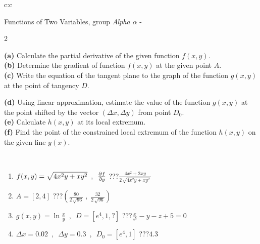 \documentclass[10pt]{report}
\begin{document}
\thispagestyle{empty}
\begin{tabular}{c:c}
\begin{minipage}[c][104.5mm][t]{0.5\linewidth}
\begin{center}
\vspace{7mm}
{\huge \LARGE Functions of Two Variables, group \textit{Alpha $\alpha$} -}\\[5mm]
\begin{minipage}{0.95\linewidth}
\begin{center}
{\small \begin{multicols}{2} \raggedright
\textbf{(a)} Calculate the partial derivative of the given function \(f(x,y)\). \\[1mm]
\textbf{(b)} Determine the gradient of function \(f(x,y)\) at the given point \(A\). \\[1mm]
\textbf{(c)} Write the equation of the tangent plane to the graph of the function \(g(x,y)\) at the point of tangency \(D\). \par \columnbreak
\textbf{(d)} Using linear approximation, estimate the value of the function \(g(x,y)\) at the point shifted by the vector \((\Delta x, \Delta y)\) from point \(D_0\). \\[1mm]
\textbf{(e)} Calculate \(h(x,y)\) at its local extremum. \\[1mm]
\textbf{(f)} Find the point of the constrained local extremum of the function \(h(x,y)\) on the given line \(y(x)\). \\[1mm]
\end{multicols}
}
\end{center}
\end{minipage}
\\[4mm]
\begin{minipage}{0.79\linewidth}
\begin{center}
\begin{varwidth}{\linewidth}
\begin{enumerate}
\normalsizerr
\item $f(x,y) = \sqrt{4x^2y + xy^2}\enspace , \enspace \pdv{f}{y}$\quad \dotfill\; ???\;\dotfill \quad $\frac{4x^2+2xy}{2\,\sqrt{4x^2y+xy^2}}$
\item $A = [2, 4]$\quad \dotfill\; ???\;\dotfill \quad $\left( \frac{80}{2\,\sqrt{96}} \;,\; \frac{32}{2\,\sqrt{96}} \right)$
\item $g(x,y) = \ln\frac{x}{y} \enspace , \enspace D=[e^{4},1,?]$\quad \dotfill\; ???\;\dotfill \quad $\frac{x}{e^5} - y - z + 5 = 0$
\item $\Delta x = {0.02} \enspace,\enspace \Delta y = {0.3} \enspace,\enspace D_0 = [e^{4},1]$\quad \dotfill\; ???\;\dotfill \quad $4.3$

\end{enumerate}
\end{varwidth}
\end{center}
\end{minipage}
\end{center}
\end{minipage}
\end{tabular}
\end{document}

